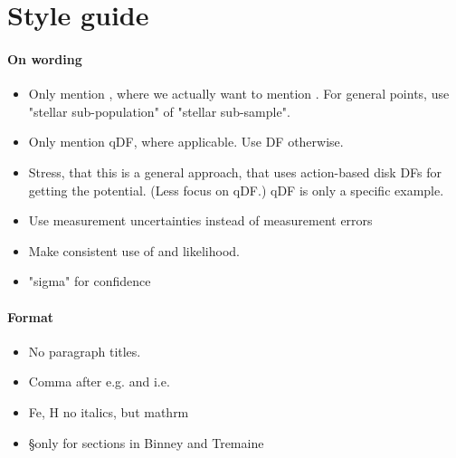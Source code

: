 \section{Style guide}

\paragraph{On wording}
\begin{itemize}
\item Only mention \MAP{}, where we actually want to mention \MAPs{}. For general points, use "stellar sub-population" of "stellar sub-sample".
\item Only mention qDF, where applicable. Use DF otherwise.
\item Stress, that this is a general approach, that uses action-based disk DFs for getting the potential. (Less focus on qDF.) qDF is only a specific example.
\item Use measurement uncertainties instead of measurement errors
\item Make consistent use of \pdf{} and likelihood.
\item "sigma" for confidence
\end{itemize}

\paragraph{Format}
\begin{itemize}
\item No paragraph titles.
\item Comma after e.g. and i.e.
\item Fe, H no italics, but  mathrm
\item \S only for sections in Binney and Tremaine
\end{itemize}
